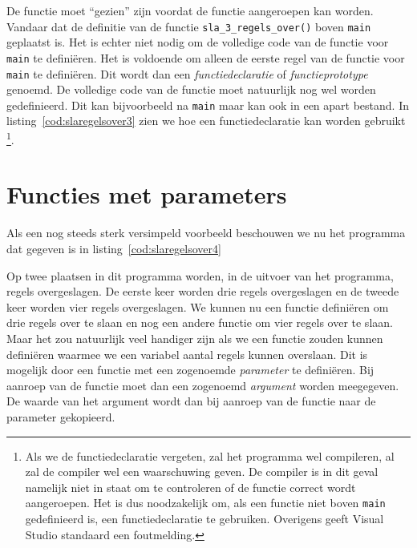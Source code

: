 De functie moet ``gezien'' zijn voordat de functie aangeroepen kan worden.
Vandaar dat de definitie van de functie \texttt{sla\_3\_regels\_over()} boven \texttt{main} geplaatst is.
Het is echter niet nodig om de volledige code van de functie voor \texttt{main} te definiëren.
Het is voldoende om alleen de eerste regel van de functie voor \texttt{main} te definiëren.
Dit wordt dan een \textsl{functiedeclaratie} of \textsl{functieprototype} genoemd.
De volledige code van de functie moet natuurlijk nog wel worden gedefinieerd.
Dit kan bijvoorbeeld na \texttt{main} maar kan ook in een apart bestand.
In listing~\ref{cod:slaregelsover3} zien we hoe een functiedeclaratie kan worden gebruikt
\footnote{Als we de functiedeclaratie vergeten, zal het programma wel compileren, al zal de compiler wel een waarschuwing geven. De compiler is in dit geval namelijk niet in staat om te controleren of de functie correct wordt aangeroepen.  Het is dus noodzakelijk om, als een functie niet boven \texttt{main} gedefinieerd is, een functiedeclaratie te gebruiken. Overigens geeft Visual Studio standaard een foutmelding.}.



\section{Functies met parameters} 
Als een nog steeds sterk versimpeld voorbeeld beschouwen we nu het programma dat gegeven is in listing~\ref{cod:slaregelsover4}


Op twee plaatsen in dit programma worden, in de uitvoer van het programma, regels overgeslagen.
De eerste keer worden drie regels overgeslagen en de tweede keer worden vier regels overgeslagen.
We kunnen nu een functie definiëren om drie regels over te slaan en nog een andere functie om vier regels over te slaan.
Maar het zou natuurlijk veel handiger zijn als we een functie zouden kunnen definiëren waarmee we een variabel aantal regels kunnen overslaan.
Dit is mogelijk door een functie met een zogenoemde \textsl{parameter} te definiëren.
Bij aanroep van de functie moet dan een zogenoemd \textsl{argument} worden meegegeven.
De waarde van het argument wordt dan bij aanroep van de functie naar de parameter gekopieerd.

